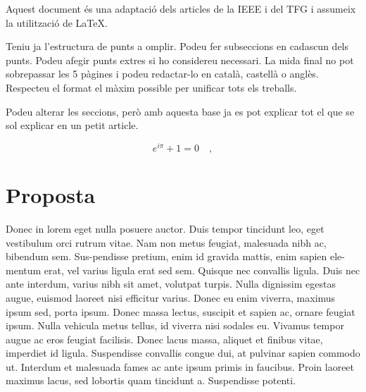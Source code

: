 ﻿\documentclass[10pt,a4paper,twocolumn,twoside]{article}
\begin{document}
Aquest document és una adaptació dels articles de la IEEE i del TFG i assumeix la utilització de \LaTeX \cite{latex}. 

Teniu ja l'estructura de punts a omplir. Podeu fer subseccions en cadascun dels punts. Podeu afegir punts extres si ho considereu necessari. La mida final no pot sobrepassar les 5 pàgines i podeu redactar-lo en català, castellà o anglès. Respecteu el format el màxim possible per unificar tots els treballs.


Podeu alterar les seccions, però amb aquesta base ja es pot explicar tot el que se sol explicar en un petit article. 

\begin{equation}
 e^{i\pi}+1=0 \quad,
\label{eq:igualtatdeuler}
\end{equation}


\section{Proposta}

Donec in lorem eget nulla posuere auctor. Duis tempor tincidunt leo, eget vestibulum orci rutrum vitae. Nam non metus feugiat, malesuada nibh ac, bibendum sem. Sus-pendisse pretium, enim id gravida mattis, enim sapien ele-mentum erat, vel varius ligula erat sed sem. Quisque nec convallis ligula. Duis nec ante interdum, varius nibh sit amet, volutpat turpis. Nulla dignissim egestas augue, euismod laoreet nisi efficitur varius. Donec eu enim viverra, maximus ipsum sed, porta ipsum. Donec massa lectus, suscipit et sapien ac, ornare feugiat ipsum. Nulla vehicula metus tellus, id viverra nisi sodales eu. Vivamus tempor augue ac eros feugiat facilisis. Donec lacus massa, aliquet et finibus vitae, imperdiet id ligula. Suspendisse convallis congue dui, at pulvinar sapien commodo ut. Interdum et malesuada fames ac ante ipsum primis in faucibus. Proin laoreet maximus lacus, sed lobortis quam tincidunt a. Suspendisse potenti. 
\end{document}
